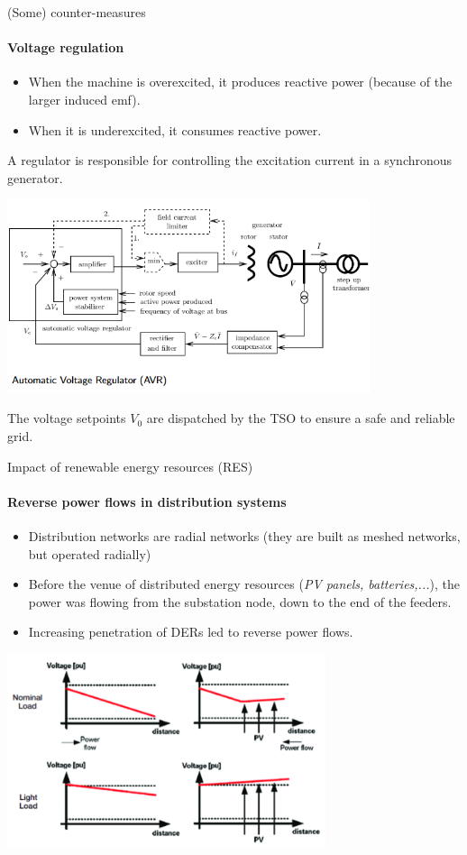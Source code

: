 \begin{frame}
{(Some) counter-measures}
\framesubtitle{Voltage regulation}
\begin{itemize}
    \item When the machine is overexcited, it produces reactive power (because of the larger induced emf).
    \item When it is underexcited, it consumes reactive power.
\end{itemize}
A regulator is responsible for controlling the excitation current in a synchronous generator.
\begin{center}
\includegraphics[width=0.8\textwidth]{images/AVR.png}
\end{center}
The voltage setpoints $V_0$ are dispatched by the TSO to ensure a safe and reliable grid.
\end{frame}

\begin{frame}
{Impact of renewable energy resources (RES)}
\framesubtitle{Reverse power flows in distribution systems}
\begin{itemize}
    \item Distribution networks are radial networks (they are built as meshed networks, but operated radially)
    \item Before the venue of distributed energy resources (\emph{PV panels, batteries,...}), the power was flowing from the substation node, down to the end of the feeders.
    \item Increasing penetration of DERs led to reverse power flows.
\end{itemize}
\begin{center}
\includegraphics[width=0.7\textwidth]{images/VoltageProfile.png}
\end{center}
\end{frame}

